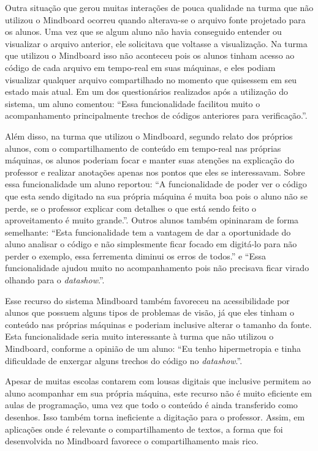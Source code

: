 Outra situação que gerou muitas interações de pouca qualidade na turma que não utilizou o Mindboard ocorreu quando alterava-se o arquivo fonte projetado para os alunos. Uma vez que se algum aluno não havia conseguido entender ou visualizar o arquivo anterior, ele solicitava que voltasse a visualização. Na turma que utilizou o Mindboard isso não aconteceu pois os alunos tinham acesso ao código de cada arquivo em tempo-real em suas máquinas, e eles podiam visualizar qualquer arquivo compartilhado no momento que quisessem em seu estado mais atual. Em um dos questionários realizados após a utilização do sistema, um aluno comentou: ``Essa funcionalidade facilitou muito o acompanhamento principalmente trechos de códigos anteriores para verificação.''.

Além disso, na turma que utilizou o Mindboard, segundo relato dos próprios alunos, com o compartilhamento de conteúdo em tempo-real nas próprias máquinas, os alunos poderiam focar e manter suas atenções na explicação do professor e realizar anotações apenas nos pontos que eles se interessavam. Sobre essa funcionalidade um aluno reportou: ``A funcionalidade de poder ver o código que esta sendo digitado na sua própria máquina é muita boa pois o aluno não se perde, se o professor explicar com detalhes o que está sendo feito o aproveitamento é muito grande.''. Outros alunos também opininaram de forma semelhante: ``Esta funcionalidade tem a vantagem de dar a oportunidade do aluno analisar o código e não simplesmente ficar focado em digitá-lo para não perder o exemplo, essa ferrementa diminui os erros de todos.'' e ``Essa funcionalidade ajudou muito no acompanhamento pois não precisava ficar virado olhando para o \emph{datashow}.''.

Esse recurso do sistema Mindboard também favoreceu na acessibilidade por alunos que possuem alguns tipos de problemas de visão, já que eles tinham o conteúdo nas próprias máquinas e poderiam inclusive alterar o tamanho da fonte. Esta funcionalidade seria muito interessante à turma que não utilizou o Mindboard, conforme a opinião de um aluno: ``Eu tenho hipermetropia e tinha dificuldade de enxergar alguns trechos do código no \emph{datashow}.''.

Apesar de muitas escolas contarem com lousas digitais que inclusive permitem ao aluno acompanhar em sua própria máquina, este recurso não é muito eficiente em aulas de programação, uma vez que todo o conteúdo é ainda transferido como desenhos. Isso também torna ineficiente a digitação para o professor. Assim, em aplicações onde é relevante o compartilhamento de textos, a forma que foi desenvolvida no Mindboard favorece o compartilhamento mais rico.

